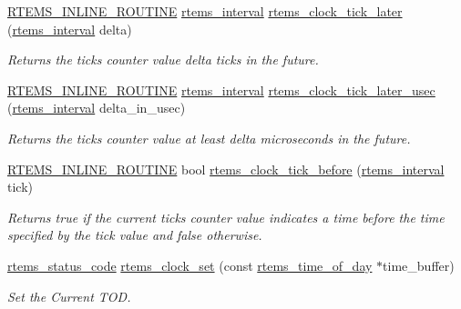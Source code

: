 \begin{DoxyCompactItemize}
\mbox{\hyperlink{group__RTEMSScoreBaseDefs_gac216239df231d5dbd15e3520b0b9313f}{R\+T\+E\+M\+S\+\_\+\+I\+N\+L\+I\+N\+E\+\_\+\+R\+O\+U\+T\+I\+NE}} \mbox{\hyperlink{group__ClassicTasks_gad39c43f949683d46874e3a5586b93aee}{rtems\+\_\+interval}} \mbox{\hyperlink{group__ClassicClock_gac8c07d906bfea4f56f5c7a46a79336c0}{rtems\+\_\+clock\+\_\+tick\+\_\+later}} (\mbox{\hyperlink{group__ClassicTasks_gad39c43f949683d46874e3a5586b93aee}{rtems\+\_\+interval}} delta)
\begin{DoxyCompactList}\small\item\em Returns the ticks counter value delta ticks in the future. \end{DoxyCompactList}\item 
\mbox{\hyperlink{group__RTEMSScoreBaseDefs_gac216239df231d5dbd15e3520b0b9313f}{R\+T\+E\+M\+S\+\_\+\+I\+N\+L\+I\+N\+E\+\_\+\+R\+O\+U\+T\+I\+NE}} \mbox{\hyperlink{group__ClassicTasks_gad39c43f949683d46874e3a5586b93aee}{rtems\+\_\+interval}} \mbox{\hyperlink{group__ClassicClock_ga711beef8147fe462897021e9afe6fade}{rtems\+\_\+clock\+\_\+tick\+\_\+later\+\_\+usec}} (\mbox{\hyperlink{group__ClassicTasks_gad39c43f949683d46874e3a5586b93aee}{rtems\+\_\+interval}} delta\+\_\+in\+\_\+usec)
\begin{DoxyCompactList}\small\item\em Returns the ticks counter value at least delta microseconds in the future. \end{DoxyCompactList}\item 
\mbox{\hyperlink{group__RTEMSScoreBaseDefs_gac216239df231d5dbd15e3520b0b9313f}{R\+T\+E\+M\+S\+\_\+\+I\+N\+L\+I\+N\+E\+\_\+\+R\+O\+U\+T\+I\+NE}} bool \mbox{\hyperlink{group__ClassicClock_gad317482772596398e87ca46163d4835e}{rtems\+\_\+clock\+\_\+tick\+\_\+before}} (\mbox{\hyperlink{group__ClassicTasks_gad39c43f949683d46874e3a5586b93aee}{rtems\+\_\+interval}} tick)
\begin{DoxyCompactList}\small\item\em Returns true if the current ticks counter value indicates a time before the time specified by the tick value and false otherwise. \end{DoxyCompactList}\item 
\mbox{\hyperlink{group__ClassicStatus_ga545d41846817eaba6143d52ee4d9e9fe}{rtems\+\_\+status\+\_\+code}} \mbox{\hyperlink{group__ClassicClock_ga3e9ce997911dc911dac29c8d9c8b6250}{rtems\+\_\+clock\+\_\+set}} (const \mbox{\hyperlink{structrtems__time__of__day}{rtems\+\_\+time\+\_\+of\+\_\+day}} $\ast$time\+\_\+buffer)
\begin{DoxyCompactList}\small\item\em Set the Current T\+OD. \end{DoxyCompactList}\item 

\end{DoxyCompactItemize}

